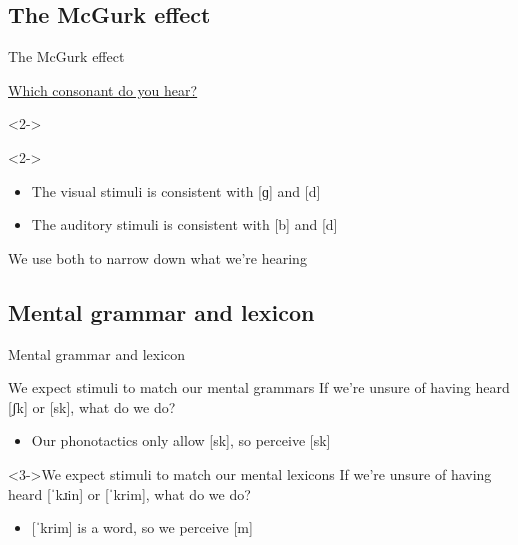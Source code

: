 \documentclass{beamer}
\newcommand{\subonesix}{The McGurk effect}
\newcommand{\suboneseven}{Mental grammar and lexicon}
\begin{document}
    \subsection{\subonesix}
      \begin{frame}{\subonesix}
        \begin{example}
          \href{https://youtu.be/aFPtc8BVdJk}{Which consonant do you hear?}
        \end{example}
        \begin{definition}<2->
           \parencite{mcgurk_hearing_1976}
        \end{definition}
        \begin{block}<2->{}
          \begin{itemize}
            \item The visual stimuli is consistent with [ɡ] and [d]
            \item The auditory stimuli is consistent with [b] and [d]
          \end{itemize}
          We use both to narrow down what we're hearing
        \end{block}
      \end{frame}

    \subsection{\suboneseven}
      \begin{frame}{\suboneseven}
        \begin{block}{We expect stimuli to match our mental grammars}
          If we're unsure of having heard [ʃk] or [sk], what do we do?
          \begin{itemize}
            \item<2-> Our phonotactics only allow [sk], so perceive [sk]
          \end{itemize}
        \end{block}
        \begin{block}<3->{We expect stimuli to match our mental lexicons}
          If we're unsure of having heard [ˈkɹin] or [ˈkrim], what do we do?
          \begin{itemize}
            \item<4-> {[}ˈkrim] is a word, so we perceive [m]
          \end{itemize}
        \end{block}
      \end{frame}
\end{document}

